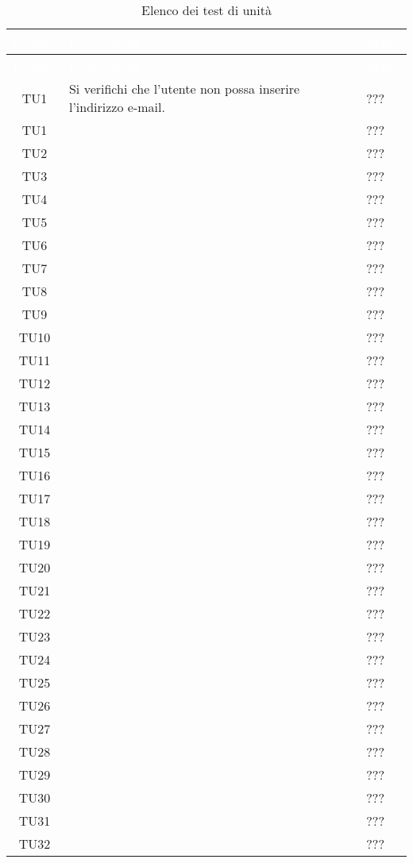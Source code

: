 {
\renewcommand{\arraystretch}{1.5}
\centering
\begin{longtable}{ c  C{8.5cm} C{3cm}}
\caption{Elenco dei test di unità}\\
\textcolor{white}{\textbf{Codice}} & \textcolor{white}{\textbf{Descrizione}} & \textcolor{white}{\textbf{Stato}}\\
\endfirsthead
{}
\textcolor{white}{\textbf{Codice}} & \textcolor{white}{\textbf{Descrizione}} & \textcolor{white}{\textbf{Stato}}\\
\endhead

TU1 & Si verifichi che l'utente non  possa inserire l'indirizzo e-mail. & ??? \\
TU1 &  & ??? \\
TU2 &  & ??? \\
TU3 &  & ??? \\
TU4 &  & ??? \\
TU5 &  & ??? \\
TU6 &  & ??? \\
TU7 &  & ??? \\
TU8 &  & ??? \\
TU9 &  & ??? \\
TU10 &  & ??? \\
TU11 &  & ??? \\
TU12 &  & ??? \\
TU13 &  & ??? \\
TU14 &  & ??? \\
TU15 &  & ??? \\
TU16 &  & ??? \\
TU17 &  & ??? \\
TU18 &  & ??? \\
TU19 &  & ??? \\
TU20 &  & ??? \\
TU21 &  & ??? \\
TU22 &  & ??? \\
TU23 &  & ??? \\
TU24 &  & ??? \\
TU25 &  & ??? \\
TU26 &  & ??? \\
TU27 &  & ??? \\
TU28 &  & ??? \\
TU29 &  & ??? \\
TU30 &  & ??? \\
TU31 &  & ??? \\
TU32 &  & ??? \\

\end{longtable}}
